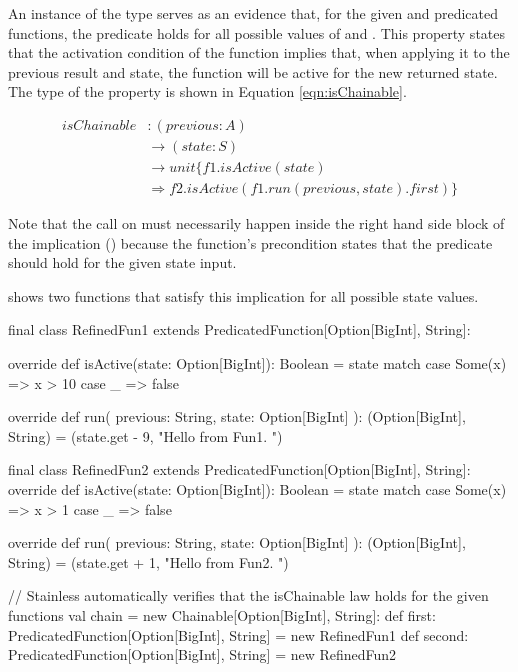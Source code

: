 An instance of the  type serves as an evidence that, for the given  and 
 predicated functions, the  predicate holds for all possible values of 
 and . This property states that the activation condition of the 
 function implies that, when applying it to the previous result and state, the  
function will be active for the new returned state. The type of the  property is shown 
in Equation \ref{eqn:isChainable}.

\begin{equation}
\label{eqn:isChainable}
\begin{split}
isChainable &: (previous: A) \\
            &\rightarrow (state: S) \\
            &\rightarrow unit\{f1.isActive(state) \\
            &\Rightarrow f2.isActive(f1.run(previous, state).first)\}
\end{split}
\end{equation}


Note that the  call on  must necessarily 
happen inside the right hand side block of the implication (\scode{==>}) because the  
function's precondition states that the  predicate should hold for the given state input.

 shows two functions that satisfy this implication for all 
possible state values.

\begin{scala}[label=lst:predicated-function-chainable-example, caption=Chainable type usage example]
final class RefinedFun1 extends PredicatedFunction[Option[BigInt], String]:

  override def isActive(state: Option[BigInt]): Boolean =
    state match
      case Some(x) => x > 10
      case _       => false

  override def run(
      previous: String,
      state: Option[BigInt]
  ): (Option[BigInt], String) =
    (state.get - 9, "Hello from Fun1. ")

final class RefinedFun2 extends PredicatedFunction[Option[BigInt], String]:
  override def isActive(state: Option[BigInt]): Boolean =
    state match
      case Some(x) => x > 1
      case _       => false

  override def run(
      previous: String,
      state: Option[BigInt]
  ): (Option[BigInt], String) =
    (state.get + 1, "Hello from Fun2. ")

// Stainless automatically verifies that the isChainable law holds for the given functions
val chain = new Chainable[Option[BigInt], String]:
  def first: PredicatedFunction[Option[BigInt], String] = new RefinedFun1
  def second: PredicatedFunction[Option[BigInt], String] = new RefinedFun2
\end{scala}

